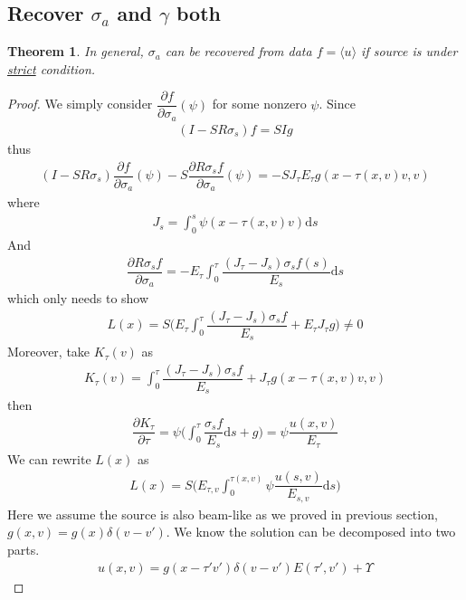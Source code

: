 \documentclass[12pt,a4paper]{article}
\newcommand{\avg}[1]{\langle#1\rangle}
\newtheorem{Thm}{Theorem}
\begin{document}
\subsection{Recover $\sigma_a$ and $\gamma$ both}
\begin{Thm}
In general, $\sigma_a$ can be recovered from data $f = \avg{u}$ if source is under \underline{strict} condition.
\end{Thm}
\begin{proof}
We simply consider $\dfrac{\partial f}{\partial \sigma_a}(\psi)$ for some nonzero $\psi$. Since
\begin{eqnarray}
(I-SR\sigma_s)f = SIg
\end{eqnarray}
thus
\begin{eqnarray}
(I-SR\sigma_s)\dfrac{\partial f}{\partial \sigma_a}(\psi) - S\dfrac{\partial R\sigma_s f}{\partial \sigma_a}(\psi) = -SJ_{\tau} E_{\tau} g(x-\tau(x,v)v,v)
\end{eqnarray}
where 
\begin{eqnarray}
J_s = \int_0^s \psi(x-\tau(x,v)v)\mathrm{d}s
\end{eqnarray}
And 
\begin{eqnarray}
\dfrac{\partial R\sigma_s f}{\partial\sigma_a} = -E_{\tau}\int_0^{\tau} \dfrac{(J_{\tau} - J_s)\sigma_s f(s)}{E_s}\mathrm{d}s
\end{eqnarray}
which only needs to show
\begin{eqnarray}
L(x) = S\Big(E_{\tau}\int_0^{\tau}\dfrac{(J_{\tau} - J_s)\sigma_s f}{E_s} + E_{\tau} J_{\tau} g\Big)\neq 0
\end{eqnarray}
Moreover, take $K_{\tau}(v)$ as
\begin{eqnarray}
K_{\tau}(v) = \int_0^{\tau}\dfrac{(J_{\tau} - J_s)\sigma_s f}{E_s} +  J_{\tau} g(x-\tau(x,v)v,v)
\end{eqnarray}
then
\begin{eqnarray}
\dfrac{\partial K_{\tau}}{\partial\tau} = \psi\Big(\int_0^{\tau}\dfrac{\sigma_s f}{E_s}\mathrm{d}s + g\Big) = \psi \dfrac{u(x,v)}{E_{\tau}}
\end{eqnarray}
We can rewrite $L(x)$ as
\begin{eqnarray}
L(x)  = S\Big(E_{\tau,v} \int_0^{\tau(x,v)} \psi \dfrac{u(s,v)}{E_{s,v}}\mathrm{d}s\Big)
\end{eqnarray}
Here we assume the source is also beam-like as we proved in previous section, $g(x,v) = g(x)\delta(v- v')$. We know the solution can be decomposed into two parts.
\begin{eqnarray}
 u (x,v) = g(x-\tau'v')\delta(v-v')E(\tau',v') + \Upsilon 

\end{eqnarray}
\end{proof}
\end{document}
